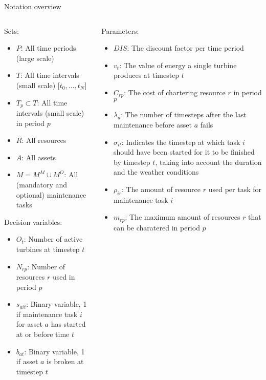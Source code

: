 \documentclass{beamer}
\begin{document}
\begin{frame}{Notation overview}
\scriptsize

\begin{columns}
\begin{column}{.48\textwidth}
Sets:
\begin{itemize}
\item $P$: All time periods (large scale)
\item $T$: All time intervals (small scale) [$t_0, \dots , t_N$]
\item $T_p \subset T$: All time intervals (small scale) in period $p$
\item $R$: All resources
\item $A$: All assets
\item $M = M^M \cup M^O$: All (mandatory and optional) maintenance tasks
\end{itemize}

Decision variables:
\begin{itemize}
\item $O_{t}$: Number of active turbines at timestep $t$
\item $N_{rp}$: Number of resources $r$ used in period $p$
\item $s_{ait}$: Binary variable, 1 if maintenance task $i$ for asset $a$ has started at or before time $t$
\item $b_{at}$: Binary variable, 1 if asset $a$ is broken at timestep $t$
\end{itemize}
\end{column}

\hfill

\begin{column}{.48\textwidth}
Parameters:
\begin{itemize}
\item $DIS$: The discount factor per time period
\item $v_t$: The value of energy a single turbine produces at timestep $t$
\item $C_{rp}$: The cost of chartering resource $r$ in period $p$
\item $\lambda_a$: The number of timesteps after the last maintenance before asset $a$ fails
\item $\sigma_{it}$: Indicates the timestep at which task $i$ should have been started for it to be finished by timestep $t$, taking into account the duration and the weather conditions
\item $\rho_{ir}$: The amount of resource $r$ used per task for maintenance task $i$
\item $m_{rp}$: The maximum amount of resources $r$ that can be charatered in period $p$
\end{itemize}
\end{column}
\end{columns}

\end{frame}
\end{document}
